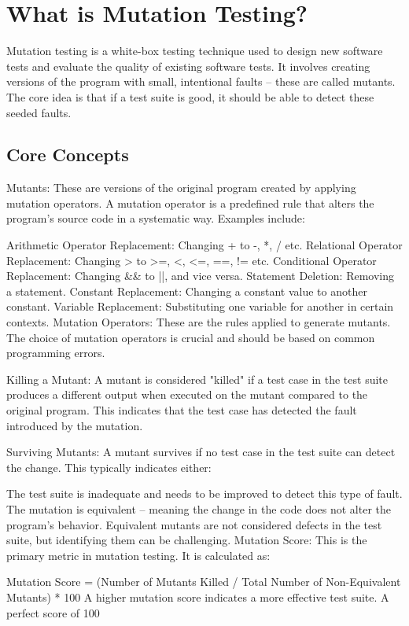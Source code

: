 \documentclass[sigplan, nonacm]{acmart}
\begin{document}
\section{What is Mutation Testing?}

Mutation testing is a white-box testing technique used to design new software tests and evaluate the quality of existing software tests. It involves creating versions of the program with small, intentional faults – these are called mutants. The core idea is that if a test suite is good, it should be able to detect these seeded faults.

\subsection{Core Concepts}

Mutants:  These are versions of the original program created by applying mutation operators. A mutation operator is a predefined rule that alters the program's source code in a systematic way. Examples include:

Arithmetic Operator Replacement: Changing + to -, *, / etc.
Relational Operator Replacement: Changing > to >=, <, <=, ==, != etc.
Conditional Operator Replacement: Changing && to ||, and vice versa.
Statement Deletion: Removing a statement.
Constant Replacement: Changing a constant value to another constant.
Variable Replacement: Substituting one variable for another in certain contexts.
Mutation Operators: These are the rules applied to generate mutants. The choice of mutation operators is crucial and should be based on common programming errors.

Killing a Mutant: A mutant is considered "killed" if a test case in the test suite produces a different output when executed on the mutant compared to the original program. This indicates that the test case has detected the fault introduced by the mutation.

Surviving Mutants: A mutant survives if no test case in the test suite can detect the change. This typically indicates either:

The test suite is inadequate and needs to be improved to detect this type of fault.
The mutation is equivalent – meaning the change in the code does not alter the program's behavior. Equivalent mutants are not considered defects in the test suite, but identifying them can be challenging.
Mutation Score: This is the primary metric in mutation testing. It is calculated as:

Mutation Score = (Number of Mutants Killed / Total Number of Non-Equivalent Mutants) * 100%
A higher mutation score indicates a more effective test suite. A perfect score of 100%
\end{document}
